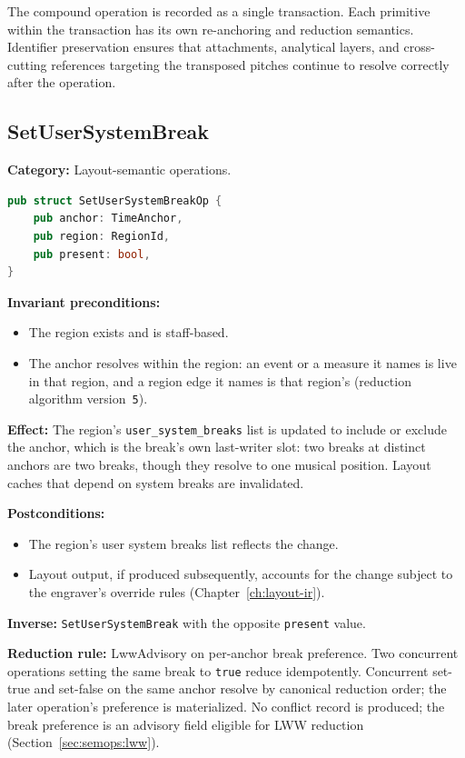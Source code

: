 \documentclass[11pt,letterpaper]{report}
\begin{document}
The compound operation is recorded as a single transaction. Each
primitive within the transaction has its own re-anchoring and
reduction semantics. Identifier preservation ensures that
attachments, analytical layers, and cross-cutting references
targeting the transposed pitches continue to resolve correctly
after the operation.

\subsection{SetUserSystemBreak}

\textbf{Category:} Layout-semantic operations.

\begin{lstlisting}[language=Rust]
pub struct SetUserSystemBreakOp {
    pub anchor: TimeAnchor,
    pub region: RegionId,
    pub present: bool,
}
\end{lstlisting}

\textbf{Invariant preconditions:}
\begin{itemize}
  \item The region exists and is staff-based.
  \item The anchor resolves within the region: an event or a measure it
    names is live in that region, and a region edge it names is that
    region's (reduction algorithm version~\texttt{5}).
\end{itemize}

\textbf{Effect:} The region's \texttt{user\_system\_breaks} list is
updated to include or exclude the anchor, which is the break's own
last-writer slot: two breaks at distinct anchors are two breaks, though
they resolve to one musical position. Layout caches that depend
on system breaks are invalidated.

\textbf{Postconditions:}
\begin{itemize}
  \item The region's user system breaks list reflects the change.
  \item Layout output, if produced subsequently, accounts for the
    change subject to the engraver's override rules
    (Chapter~\ref{ch:layout-ir}).
\end{itemize}

\textbf{Inverse:} \texttt{SetUserSystemBreak} with the opposite
\texttt{present} value.

\textbf{Reduction rule:} LwwAdvisory on per-anchor break preference.
Two concurrent operations setting the same break to \texttt{true}
reduce idempotently. Concurrent set-true and set-false on the same
anchor resolve by canonical reduction order; the later operation's
preference is materialized. No conflict record is produced; the
break preference is an advisory field eligible for LWW reduction
(Section~\ref{sec:semops:lww}).
\end{document}
